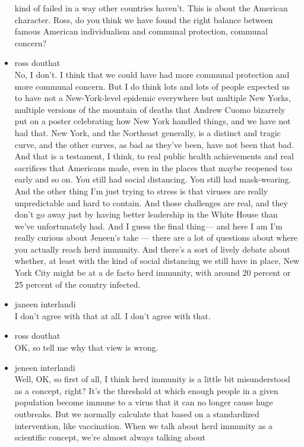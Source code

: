 \begin{itemize}
  kind of failed in a way other countries haven't. This is about the
  American character. Ross, do you think we have found the right balance
  between famous American individualism and communal protection,
  communal concern?
\item
  ross douthat\\
  No, I don't. I think that we could have had more communal protection
  and more communal concern. But I do think lots and lots of people
  expected us to have not a New-York-level epidemic everywhere but
  multiple New Yorks, multiple versions of the mountain of deaths that
  Andrew Cuomo bizarrely put on a poster celebrating how New York
  handled things, and we have not had that. New York, and the Northeast
  generally, is a distinct and tragic curve, and the other curves, as
  bad as they've been, have not been that bad. And that is a testament,
  I think, to real public health achievements and real sacrifices that
  Americans made, even in the places that maybe reopened too early and
  so on. You still had social distancing. You still had mask-wearing.
  And the other thing I'm just trying to stress is that viruses are
  really unpredictable and hard to contain. And those challenges are
  real, and they don't go away just by having better leadership in the
  White House than we've unfortunately had. And I guess the final
  thing--- and here I am I'm really curious about Jeneen's take ---
  there are a lot of questions about where you actually reach herd
  immunity. And there's a sort of lively debate about whether, at least
  with the kind of social distancing we still have in place, New York
  City might be at a de facto herd immunity, with around 20 percent or
  25 percent of the country infected.
\item
  janeen interlandi\\
  I don't agree with that at all. I don't agree with that.
\item
  ross douthat\\
  OK, so tell me why that view is wrong.
\item
  jeneen interlandi\\
  Well, OK, so first of all, I think herd immunity is a little bit
  misunderstood as a concept, right? It's the threshold at which enough
  people in a given population become immune to a virus that it can no
  longer cause huge outbreaks. But we normally calculate that based on a
  standardized intervention, like vaccination. When we talk about herd
  immunity as a scientific concept, we're almost always talking about

\end{itemize}
